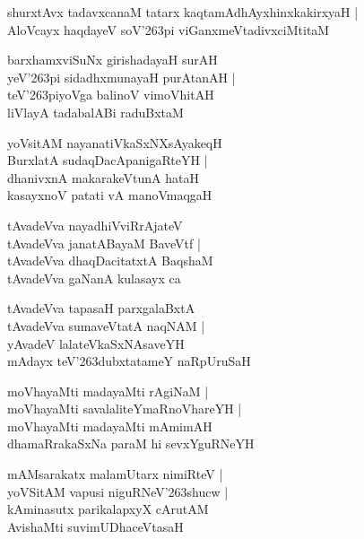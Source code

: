 \documentclass[twoside,12pt,openright]{book}
\def\S{\char'263}
\newcounter{shloka}[chapter]
\begin{document}
\begin{shloka}
shurxtAvx  tadavxcanaM tatarx kaqtamAdhAyxhinxkakirxyaH |\\
AloVcayx haqdayeV soV\S pi viGanxmeVtadivxciMtitaM 
\end{shloka}

\begin{shloka}
barxhamxviSuNx girishadayaH surAH \\
yeV\S pi sidadhxmunayaH purAtanAH |\\
teV\S piyoVga balinoV vimoVhitAH \\
liVlayA tadabalABi raduBxtaM
\end{shloka}

\begin{shloka}
yoVsitAM nayanatiVkaSxNXsAyakeqH \\
BurxlatA sudaqDacApanigaRteYH |\\
dhanivxnA makarakeVtunA hataH \\
kasayxnoV patati vA manoVmaqgaH 
\end{shloka}

\begin{shloka}
tAvadeVva nayadhiVviRrAjateV \\
tAvadeVva janatABayaM BaveVtf |\\
tAvadeVva dhaqDacitatxtA BaqshaM \\
tAvadeVva gaNanA kulasayx ca
\end{shloka}

\begin{shloka}
tAvadeVva tapasaH parxgalaBxtA \\
tAvadeVva sumaveVtatA naqNAM |\\
yAvadeV lalateVkaSxNAsaveYH \\
mAdayx teV\S dubxtatameY naRpUruSaH
\end{shloka}

\begin{shloka}
moVhayaMti madayaMti rAgiNaM |\\
moVhayaMti savalaliteYmaRnoVhareYH |\\
moVhayaMti madayaMti mAmimAH \\
dhamaRrakaSxNa paraM hi sevxYguRNeYH
\end{shloka}

\begin{shloka}
mAMsarakatx malamUtarx nimiRteV |\\
yoVSitAM vapusi niguRNeV\S shucw |\\
kAminasutx parikalapxyX cArutAM \\
AvishaMti suvimUDhaceVtasaH
\end{shloka}
\end{document}
